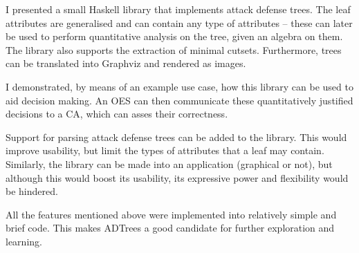 \documentclass{scrreprt}
\begin{document}
I presented a small Haskell library that implements attack defense trees. The
leaf attributes are generalised and can contain any type of attributes -- these
can later be used to perform quantitative analysis on the tree, given an algebra
on them.  The library also supports the extraction of minimal cutsets.
Furthermore, trees can be translated into Graphviz and rendered as images.

I demonstrated, by means of an example use case, how this library can be used to
aid decision making. An OES can then communicate these quantitatively justified
decisions to a CA, which can asses their correctness.

Support for parsing attack defense trees can be added to the library. This would
improve usability, but limit the types of attributes that a leaf may contain.
Similarly, the library can be made into an application (graphical or not), but
although this would boost its usability, its expressive power and flexibility
would be hindered. 

All the features mentioned above were implemented into relatively simple and
brief code. This makes ADTrees a good candidate for further exploration and
learning.



\end{document}
